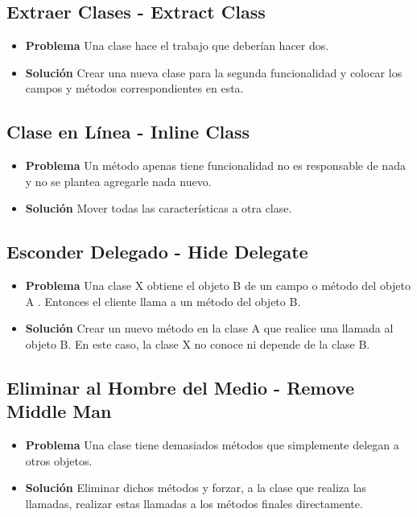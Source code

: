 \documentclass[11pt,a4paper,oneside]{book}
\begin{document}
\subsection{Extraer Clases - Extract Class}
\begin{itemize}
    \item \textbf{Problema} Una clase hace el trabajo que deberían hacer dos.
    \item \textbf{Solución} Crear una nueva clase para la segunda funcionalidad y colocar los campos y métodos correspondientes en esta.
\end{itemize}
    
\subsection{Clase en Línea - Inline Class}
\begin{itemize}
    \item \textbf{Problema} Un método apenas tiene funcionalidad no es responsable de nada y no se plantea agregarle nada nuevo.
    \item \textbf{Solución} Mover todas las características a otra clase.
\end{itemize}
    
\subsection{Esconder Delegado - Hide Delegate}
\begin{itemize}
    \item \textbf{Problema} Una clase X obtiene el objeto B de un campo o método del objeto A . Entonces el cliente llama a un método del objeto B.
    \item \textbf{Solución} Crear un nuevo método en la clase A que realice una llamada al objeto B. En este caso, la clase X no conoce ni depende de la clase B.
\end{itemize}

\subsection{Eliminar al Hombre del Medio - Remove Middle Man} 
\begin{itemize}
    \item \textbf{Problema} Una clase tiene demasiados métodos que simplemente delegan a otros objetos.
    \item \textbf{Solución} Eliminar dichos métodos y forzar, a la clase que realiza las llamadas, realizar estas llamadas a los métodos finales directamente.
\end{itemize}
\end{document}
